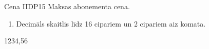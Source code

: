 \parameterTable
{Cena}
{IIDP15}
{
	Maksas abonementa cena.
}
{
	\begin{enumerate}
		\item Decimāls skaitlis līdz 16 cipariem un 2 cipariem aiz komata.
	\end{enumerate}
}
{
	1234,56
}
